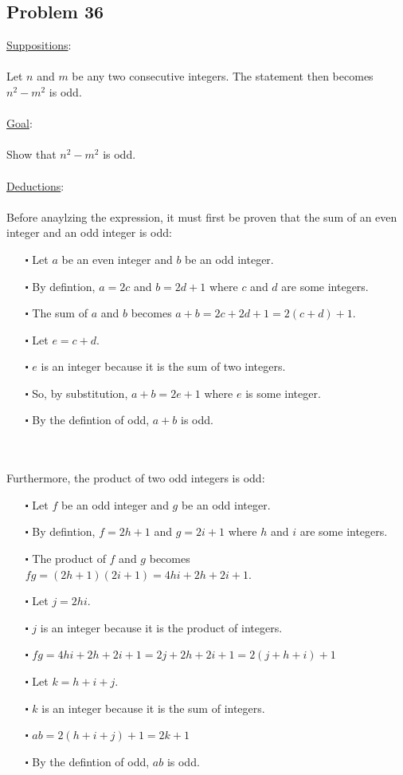 \documentclass[12pt]{article}
\begin{document}
\subsection*{Problem 36}
\underline{Suppositions}:
\\ \\
Let $n$ and $m$ be any two consecutive integers. The statement then becomes $n^2 - m^2$ is odd. 
\\ \\
\underline{Goal}:
\\ \\
Show that $n^2 - m^2$ is odd.
\\ \\
\underline{Deductions}:
\\ \\
Before anaylzing the expression, it must first be proven that the sum of an even integer and an odd integer is odd:
\begin{itemize}
  \item [$\centerdot$] Let $a$ be an even integer and $b$ be an odd integer.
  \item [$\centerdot$] By defintion, $a = 2c$ and $b = 2d+1$ where $c$ and $d$ are some integers.
  \item [$\centerdot$] The sum of $a$ and $b$ becomes $a+b = 2c+2d+1 = 2(c+d) + 1$.
  \item [$\centerdot$] Let $e = c + d$.
  \item [$\centerdot$] $e$ is an integer because it is the sum of two integers.
  \item [$\centerdot$] So, by substitution, $a+b = 2e+1$ where $e$ is some integer.
  \item [$\centerdot$] By the defintion of odd, $a+b$ is odd.
\end{itemize}
\newblock
\\ \\
Furthermore, the product of two odd integers is odd:
\begin{itemize}
  \item [$\centerdot$] Let $f$ be an odd integer and $g$ be an odd integer.
  \item [$\centerdot$] By defintion, $f = 2h+1$ and $g = 2i+1$ where $h$ and $i$ are some integers.
  \item [$\centerdot$] The product of $f$ and $g$ becomes $fg = (2h+1)(2i+1) = 4hi + 2h + 2i + 1$.
  \item [$\centerdot$] Let $j = 2hi$.
  \item [$\centerdot$] $j$ is an integer because it is the product of integers.
  \item [$\centerdot$] $fg = 4hi + 2h + 2i + 1 = 2j + 2h + 2i + 1 = 2(j+h+i)+1$
  \item [$\centerdot$] Let $k = h+i+j$.
  \item [$\centerdot$] $k$ is an integer because it is the sum of integers.
  \item [$\centerdot$] $ab = 2(h+i+j)+1 = 2k+1$
  \item [$\centerdot$] By the defintion of odd, $ab$ is odd.
\end{itemize}
\end{document}
